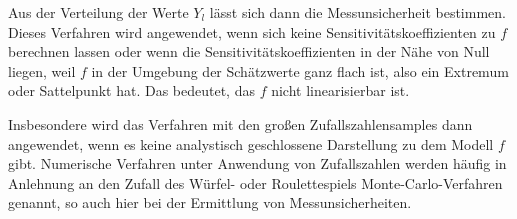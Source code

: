 Aus der Verteilung der Werte $Y_l$ lässt sich dann die Messunsicherheit bestimmen.
Dieses Verfahren wird angewendet, wenn sich keine Sensitivitätskoeffizienten zu $f$
berechnen lassen oder wenn die Sensitivitätskoeffizienten in der Nähe von Null liegen, weil
$f$ in der Umgebung der Schätzwerte ganz flach ist, also ein Extremum oder Sattelpunkt hat.
Das bedeutet, das $f$ nicht linearisierbar ist.

Insbesondere wird das Verfahren mit den großen Zufallszahlensamples dann angewendet, wenn es
keine analystisch geschlossene Darstellung zu dem Modell $f$ gibt.
Numerische Verfahren unter Anwendung von Zufallszahlen werden häufig in Anlehnung an den Zufall
des Würfel- oder Roulettespiels Monte-Carlo-Verfahren genannt, so auch hier bei der Ermittlung
von Messunsicherheiten.

